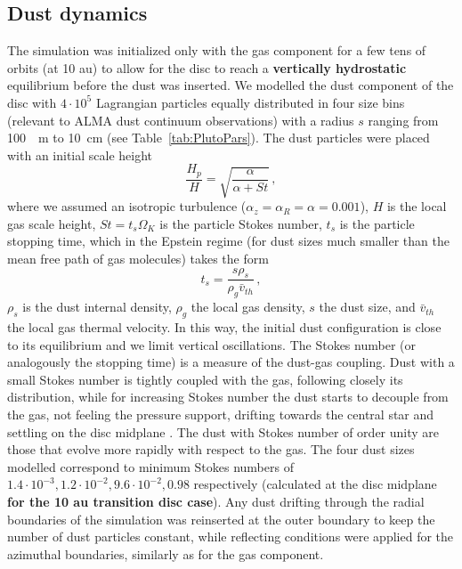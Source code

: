\documentclass[fleqn,usenatbib]{mnras}
\begin{document}
    \subsection{Dust dynamics}\label{sec:dust}
    
        The simulation was initialized only with the gas component for a few tens of orbits (at 10 au) to allow for the disc to reach a \textbf{vertically hydrostatic} equilibrium before the dust was inserted.
        We modelled the dust component of the disc with $4\cdot10^5$ Lagrangian particles equally distributed in four size bins (relevant to ALMA dust continuum observations) with a radius $s$ ranging from \SI{100}{\mu m} to \SI{10}{cm} (see Table~\ref{tab:PlutoPars}).
        The dust particles were placed with an initial scale height \citep{Youdin2007}
        \begin{equation}\label{eq:scale-height}
            \frac{H_p}{H} = \sqrt{\frac{\alpha}{\alpha + St}}\,,
        \end{equation}
        where we assumed an isotropic turbulence ($\alpha_z = \alpha_R = \alpha = 0.001$), $H$ is the local gas scale height, $St = t_s\Omega_K$ is the particle Stokes number, $t_s$ is the particle stopping time, which in the Epstein regime (for dust sizes much smaller than the mean free path of gas molecules) takes the form
        \begin{equation}\label{eq:Stokes_number}
            t_s = \frac{s\rho_s}{\rho_g\bar{v}_{th}}\,,
        \end{equation}
        $\rho_s$ is the dust internal density, $\rho_g$ the local gas density, $s$ the dust size, and $\bar{v}_{th}$ the local gas thermal velocity. In this way, the initial dust configuration is close to its equilibrium and we limit vertical oscillations.
        The Stokes number (or analogously the stopping time) is a measure of the dust-gas coupling. Dust with a small Stokes number is tightly coupled with the gas, following closely its distribution, while for increasing Stokes number the dust starts to decouple from the gas, not feeling the pressure support, drifting towards the central star and settling on the disc midplane \citep{Whipple1972,Weidenschilling1977}. The dust with Stokes number of order unity are those that evolve more rapidly with respect to the gas.
        The four dust sizes modelled correspond to minimum Stokes numbers of $1.4\cdot10^{-3}, 1.2\cdot10^{-2}, 9.6\cdot10^{-2}, 0.98$ respectively (calculated at the disc midplane \textbf{for the 10 au transition disc case}).
        Any dust drifting through the radial boundaries of the simulation was reinserted at the outer boundary to keep the number of dust particles constant, while reflecting conditions were applied for the azimuthal boundaries, similarly as for the gas component.
\end{document}

